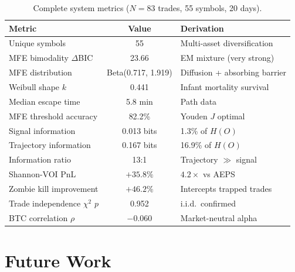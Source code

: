 \documentclass[11pt,a4paper]{article}
\begin{document}
\begin{table}[H]
\centering
\caption{Complete system metrics ($N=83$ trades, 55 symbols, 20 days).}
\begin{tabular}{lcl}
\toprule
\textbf{Metric} & \textbf{Value} & \textbf{Derivation} \\
\midrule
Unique symbols & 55 & Multi-asset diversification \\
MFE bimodality $\Delta$BIC & 23.66 & EM mixture (very strong) \\
MFE distribution & Beta(0.717, 1.919) & Diffusion + absorbing barrier \\
Weibull shape $k$ & 0.441 & Infant mortality survival \\
Median escape time & 5.8 min & Path data \\
MFE threshold accuracy & 82.2\% & Youden $J$ optimal \\
Signal information & 0.013 bits & 1.3\% of $H(O)$ \\
Trajectory information & 0.167 bits & 16.9\% of $H(O)$ \\
Information ratio & 13:1 & Trajectory $\gg$ signal \\
Shannon-VOI PnL & $+35.8\%$ & $4.2\times$ vs AEPS \\
Zombie kill improvement & $+46.2\%$ & Intercepts trapped trades \\
Trade independence $\chi^2$ $p$ & 0.952 & i.i.d.\ confirmed \\
BTC correlation $\rho$ & $-0.060$ & Market-neutral alpha \\
\bottomrule
\end{tabular}
\end{table}


\section{Future Work}
\label{sec:future}
\end{document}
